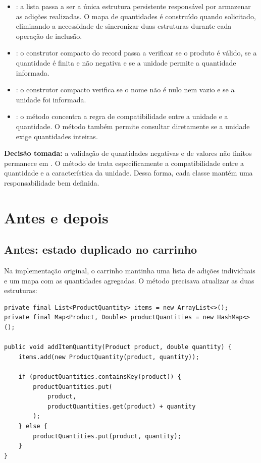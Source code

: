 \begin{itemize}

\item {}: a lista  passa a ser a única estrutura persistente responsável por armazenar as adições realizadas. O mapa de quantidades é construído quando solicitado, eliminando a necessidade de sincronizar duas estruturas durante cada operação de inclusão.

\item {}: o construtor compacto do record passa a verificar se o produto é válido, se a quantidade é finita e não negativa e se a unidade permite a quantidade informada.

\item {}: o construtor compacto verifica se o nome não é nulo nem vazio e se a unidade foi informada.

\item {}: o método  concentra a regra de compatibilidade entre a unidade e a quantidade. O método  também permite consultar diretamente se a unidade exige quantidades inteiras.

\end{itemize}

\textbf{Decisão tomada:} a validação de quantidades negativas e de valores não finitos permanece em . O método  de  trata especificamente a compatibilidade entre a quantidade e a característica da unidade. Dessa forma, cada classe mantém uma responsabilidade bem definida.

\section{Antes e depois}

\subsection{Antes: estado duplicado no carrinho}

Na implementação original, o carrinho mantinha uma lista de adições individuais e um mapa com as quantidades agregadas. O método  precisava atualizar as duas estruturas:

\begin{lstlisting}
private final List<ProductQuantity> items = new ArrayList<>();
private final Map<Product, Double> productQuantities = new HashMap<>();

public void addItemQuantity(Product product, double quantity) {
    items.add(new ProductQuantity(product, quantity));

    if (productQuantities.containsKey(product)) {
        productQuantities.put(
            product,
            productQuantities.get(product) + quantity
        );
    } else {
        productQuantities.put(product, quantity);
    }
}
\end{lstlisting}

